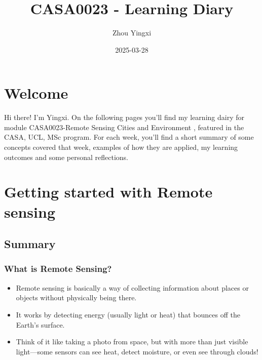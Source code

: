 \documentclass[
  letterpaper,
]{scrbook}
\title{CASA0023 - Learning Diary}
\author{Zhou Yingxi}
\date{2025-03-28}
\renewcommand*\contentsname{Table of contents}
\newcommand\contentsname{Table of contents}
\begin{document}
\frontmatter
\maketitle

\renewcommand*\contentsname{Table of contents}
{
\setcounter{tocdepth}{2}
\tableofcontents
}

\mainmatter
{}

\chapter*{Welcome}\label{welcome}


Hi there! I'm Yingxi. On the following pages you'll find my learning
dairy for module CASA0023-Remote Sensing Cities and Environment ,
featured in the CASA, UCL, MSc program. For each week, you'll find a
short summary of some concepts covered that week, examples of how they
are applied, my learning outcomes and some personal reflections.


\chapter{Getting started with Remote
sensing}\label{getting-started-with-remote-sensing}

\section{Summary}\label{summary}

\subsection{What is Remote Sensing?}\label{what-is-remote-sensing}

\begin{itemize}
\item
  Remote sensing is basically a way of collecting information about
  places or objects without physically being there.
\item
  It works by detecting energy (usually light or heat) that bounces off
  the Earth's surface.
\item
  Think of it like taking a photo from space, but with more than just
  visible light---some sensors can see heat, detect moisture, or even
  see through clouds!
\end{itemize}
\end{document}
